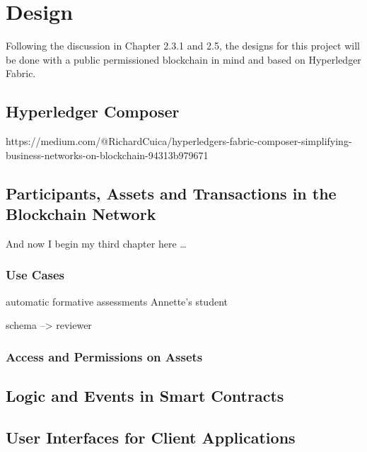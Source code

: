 \chapter{Design}

Following the discussion in Chapter 2.3.1 and 2.5, the designs for this project 
will be done with a public permissioned blockchain in mind and based on 
Hyperledger Fabric.

\section*{Hyperledger Composer}

https://medium.com/@RichardCuica/hyperledgers-fabric-composer-simplifying-business-networks-on-blockchain-94313b979671

\section{Participants, Assets and Transactions in the Blockchain Network}
And now I begin my third chapter here \dots

\subsection{Use Cases}

automatic formative assessments Annette's student

schema --> reviewer

\subsection{Access and Permissions on Assets}

\section{Logic and Events in Smart Contracts}

\section{User Interfaces for Client Applications}